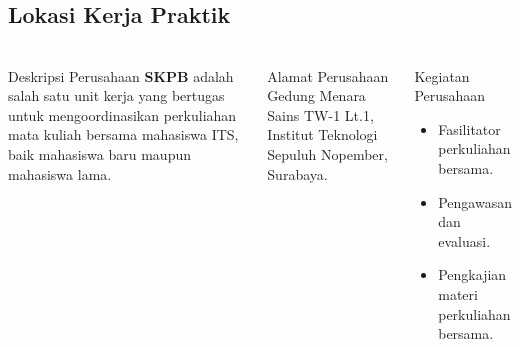 \documentclass[aspectratio=169,t,xcolor=table]{beamer}
\begin{document}
\subsection{Lokasi Kerja Praktik}
\begin{frame}
    \frametitle{\insertsubsection}
    \begin{columns}
        \begin{block}{Deskripsi Perusahaan}
            \textbf{SKPB} adalah salah satu unit kerja yang bertugas untuk mengoordinasikan perkuliahan mata kuliah bersama mahasiswa ITS, baik mahasiswa baru maupun mahasiswa lama.
        \end{block}

        \begin{alertblock}{Alamat Perusahaan}
            Gedung Menara Sains TW-1 Lt.1, Institut Teknologi Sepuluh Nopember, Surabaya.
        \end{alertblock}
    
        \begin{exampleblock}{Kegiatan Perusahaan}
            \begin{itemize}
                \item Fasilitator perkuliahan bersama.
                \item Pengawasan dan evaluasi.
                \item Pengkajian materi perkuliahan bersama.
            \end{itemize}
        \end{exampleblock}



\end{columns}
\end{frame}
\end{document}
